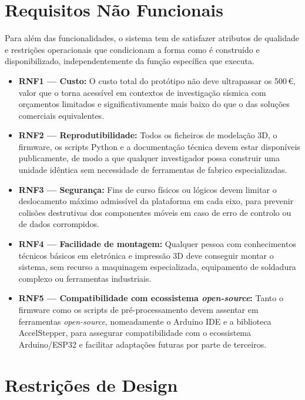 \section{Requisitos Não Funcionais}
\label{sec:requisitos-nao-funcionais}

Para além das funcionalidades, o sistema tem de satisfazer atributos de qualidade e restrições operacionais que condicionam a forma como é construído e disponibilizado, independentemente da função específica que executa.

\begin{itemize}
    \item \textbf{RNF1 --- Custo:} O custo total do protótipo não deve ultrapassar os 500\,\euro{}, valor que o torna acessível em contextos de investigação sísmica com orçamentos limitados e significativamente mais baixo do que o das soluções comerciais equivalentes.

    \item \textbf{RNF2 --- Reprodutibilidade:} Todos os ficheiros de modelação 3D, o firmware, os scripts Python e a documentação técnica devem estar disponíveis publicamente, de modo a que qualquer investigador possa construir uma unidade idêntica sem necessidade de ferramentas de fabrico especializadas.

    \item \textbf{RNF3 --- Segurança:} Fins de curso físicos ou lógicos devem limitar o deslocamento máximo admissível da plataforma em cada eixo, para prevenir colisões destrutivas dos componentes móveis em caso de erro de controlo ou de dados corrompidos.

    \item \textbf{RNF4 --- Facilidade de montagem:} Qualquer pessoa com conhecimentos técnicos básicos em eletrónica e impressão 3D deve conseguir montar o sistema, sem recurso a maquinagem especializada, equipamento de soldadura complexo ou ferramentas industriais.

    \item \textbf{RNF5 --- Compatibilidade com ecossistema \textit{open-source}:} Tanto o firmware como os scripts de pré-processamento devem assentar em ferramentas \textit{open-source}, nomeadamente o Arduino IDE e a biblioteca AccelStepper, para assegurar compatibilidade com o ecossistema Arduino/ESP32 e facilitar adaptações futuras por parte de terceiros.
\end{itemize}


\section{Restrições de Design}
\label{sec:restricoes-design}

